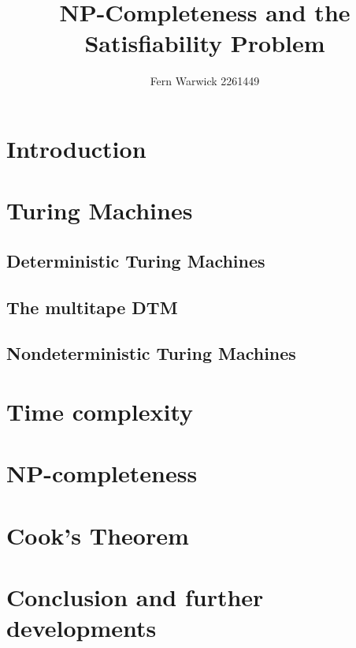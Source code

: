 \documentclass[12pt,a4paper]{article}
\title{NP-Completeness and the Satisfiability Problem}
\author{Fern Warwick 2261449}
\begin{document}
\maketitle

\section{Introduction}


\section{Turing Machines}
\subsection{Deterministic Turing Machines}


\subsection{The multitape DTM}


\subsection{Nondeterministic Turing Machines}


\newpage
\section{Time complexity}


\section{NP-completeness}


\section{Cook's Theorem}


\section{Conclusion and further developments}


\printbibliography
\end{document}
